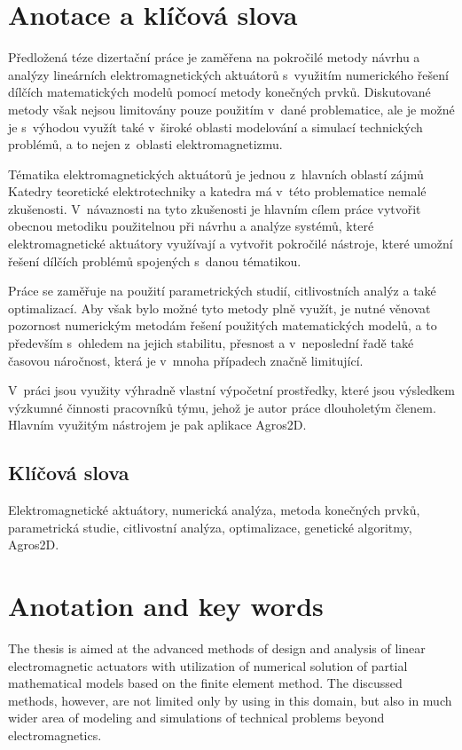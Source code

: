 \chapter*{Anotace a klíčová slova}
Předložená téze dizertační práce je zaměřena na pokročilé metody návrhu a analýzy lineárních elektromagnetických aktuátorů s~využitím numerického řešení dílčích matematických modelů pomocí metody konečných prvků. Diskutované metody však nejsou limitovány pouze použitím v~dané problematice, ale je možné je s~výhodou využít také v~široké oblasti modelování a simulací technických problémů, a to nejen z~oblasti elektromagnetizmu.

Tématika elektromagnetických aktuátorů je jednou z~hlavních oblastí zájmů Katedry teoretické elektrotechniky a katedra má v~této problematice nemalé zkušenosti. V~návaznosti na tyto zkušenosti je hlavním cílem práce vytvořit obecnou metodiku použitelnou při návrhu a analýze systémů, které elektromagnetické aktuátory využívají a vytvořit pokročilé nástroje, které umožní řešení dílčích problémů spojených s~danou tématikou.

Práce se zaměřuje na použití parametrických studií, citlivostních analýz a také optimalizací. Aby však bylo možné tyto metody plně využít, je nutné věnovat pozornost numerickým metodám řešení použitých matematických modelů, a to především s~ohledem na jejich stabilitu, přesnost a v~neposlední řadě také časovou náročnost, která je v~mnoha případech značně limitující. 

V~práci jsou využity výhradně vlastní výpočetní prostředky, které jsou výsledkem výzkumné činnosti pracovníků týmu, jehož je autor práce dlouholetým členem. Hlavním využitým nástrojem je pak aplikace Agros2D.

\section*{Klíčová slova}
Elektromagnetické aktuátory, numerická analýza, metoda konečných prvků, parametrická studie, citlivostní analýza, optimalizace, genetické algoritmy, Agros2D.

\chapter*{Anotation and key words}
The thesis is aimed at the advanced methods of design and analysis of linear electromagnetic actuators with utilization of numerical solution of partial mathematical models based on the finite element method. The discussed methods, however, are not limited only by using in this domain, but also in much wider area of modeling and simulations of technical problems beyond electromagnetics.

